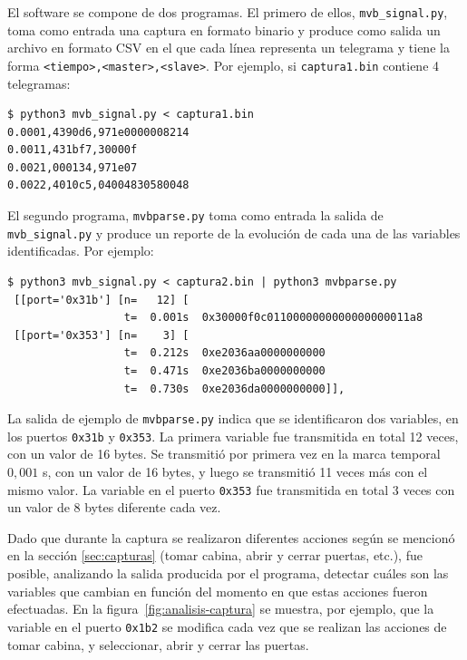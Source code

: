 El software se compone de dos programas. El primero de ellos, \texttt{mvb\_signal.py}, toma como entrada una captura en formato binario y produce como salida un archivo en formato CSV en el que cada línea representa un telegrama y tiene la forma \texttt{<tiempo>,<master>,<slave>}. Por ejemplo, si \texttt{captura1.bin} contiene 4 telegramas:

\begin{lstlisting}[basicstyle=\footnotesize,breaklines=true,backgroundcolor=\color{light-gray}]
$ python3 mvb_signal.py < captura1.bin
0.0001,4390d6,971e0000008214
0.0011,431bf7,30000f
0.0021,000134,971e07
0.0022,4010c5,04004830580048
\end{lstlisting}

El segundo programa, \texttt{mvbparse.py} toma como entrada la salida de \texttt{mvb\_signal.py} y produce un reporte de la evolución de cada una de las variables identificadas. Por ejemplo:

\begin{lstlisting}[basicstyle=\footnotesize,breaklines=true,backgroundcolor=\color{light-gray}]
$ python3 mvb_signal.py < captura2.bin | python3 mvbparse.py
 [[port='0x31b'] [n=   12] [
                  t=  0.001s  0x30000f0c0110000000000000000011a8
 [[port='0x353'] [n=    3] [
                  t=  0.212s  0xe2036aa0000000000
                  t=  0.471s  0xe2036ba0000000000
                  t=  0.730s  0xe2036da0000000000]],
\end{lstlisting}

La salida de ejemplo de \texttt{mvbparse.py} indica que se identificaron dos variables, en los puertos \texttt{0x31b} y \texttt{0x353}.
La primera variable fue transmitida en total 12 veces, con un valor de 16 bytes. Se transmitió por primera vez en la marca temporal $0{,}001$ s, con un valor de 16 bytes, y luego se transmitió 11 veces más con el mismo valor.
La variable en el puerto \texttt{0x353} fue transmitida en total 3 veces con un valor de 8 bytes diferente cada vez.

Dado que durante la captura se realizaron diferentes acciones según se mencionó en la sección \ref{sec:capturas} (tomar cabina, abrir y cerrar puertas, etc.), fue posible, analizando la salida producida por el programa, detectar cuáles son las variables que cambian en función del momento en que estas acciones fueron efectuadas. En la figura~\ref{fig:analisis-captura} se muestra, por ejemplo, que la variable en el puerto \texttt{0x1b2} se modifica cada vez que se realizan las acciones de tomar cabina, y seleccionar, abrir y cerrar las puertas.

